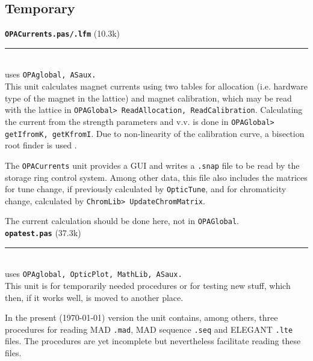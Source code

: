 \documentclass[12pt]{article}
\newcommand\code[1]{{\tt #1}}
\newcommand{\todo}[1]{{\color{red} #1}}
\newcommand\opamodule[3]{{\bf \tt #1} #2\\  \rule[3pt]{\textwidth}{0.2pt} \\ {\scriptsize uses \tt  #3}\\[1ex]}
\begin{document}
\subsection{Temporary}
\opamodule{OPACurrents.pas/.lfm}{(10.3k)}{OPAglobal, ASaux.}
This unit calculates magnet currents using two tables for allocation (i.e. hardware type of the magnet in the lattice) and magnet calibration, which may be read with the lattice in \code{OPAGlobal> ReadAllocation, ReadCalibration}. Calculating the current from the strength parameters and v.v. is done in \code{OPAGlobal> getIfromK, getKfromI}. Due to non-linearity of the calibration curve, a bisection root finder is used \cite{numrec}.

The {\tt OPACurrents} unit provides a GUI and writes a {\tt .snap} file to be read by the storage ring control system. Among other data, this file also includes the matrices for tune change, if previously calculated by \code{OpticTune}, and for chromaticity change, calculated by \code{ChromLib> UpdateChromMatrix}.

\todo{The current calculation should be done here, not in {\tt OPAGlobal}.}\\


\opamodule{opatest.pas}{(37.3k)}{OPAglobal, OpticPlot, MathLib, ASaux.}
This unit is for temporarily needed procedures or for testing new stuff, which then, if it works well, is moved to another place.

In the present (\today) version the unit contains, among others, three procedures for reading MAD {\tt .mad}, MAD sequence {\tt .seq} and ELEGANT {\tt .lte} files. The procedures are yet incomplete but nevertheless facilitate reading these files.\\
\end{document}

